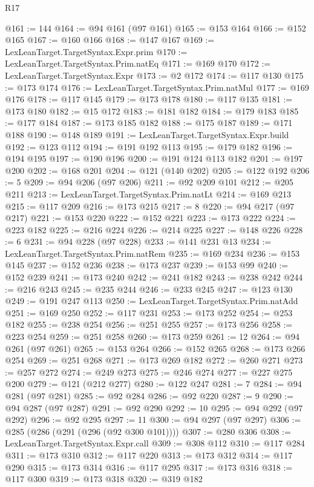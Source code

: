 \begin{lexlean}{R17}
\begin{coremodule}
@161 := 144
@164 := @94 @161 (@97 @161)
@165 := @153 @164
@166 := @152 @165
@167 := @160 @166
@168 := @147 @167
@169 := LexLeanTarget.TargetSyntax.Expr.prim
@170 := LexLeanTarget.TargetSyntax.Prim.natEq
@171 := @169 @170
@172 := LexLeanTarget.TargetSyntax.Expr
@173 := @2 @172
@174 := @117 @130
@175 := @173 @174
@176 := LexLeanTarget.TargetSyntax.Prim.natMul
@177 := @169 @176
@178 := @117 @145
@179 := @173 @178
@180 := @117 @135
@181 := @173 @180
@182 := @15 @172
@183 := @181 @182
@184 := @179 @183
@185 := @177 @184
@187 := @173 @185 @182
@188 := @175 @187
@189 := @171 @188
@190 := @148 @189
@191 := LexLeanTarget.TargetSyntax.Expr.build
@192 := @123 @112
@194 := @191 @192 @113
@195 := @179 @182
@196 := @194 @195
@197 := @190 @196
@200 := @191 @124 @113 @182
@201 := @197 @200
@202 := @168 @201
@204 := @121 (@140 @202)
@205 := @122 @192
@206 := 5
@209 := @94 @206 (@97 @206)
@211 := @92 @209 @101
@212 := @205 @211
@213 := LexLeanTarget.TargetSyntax.Prim.natLt
@214 := @169 @213
@215 := @117 @209
@216 := @173 @215
@217 := 8
@220 := @94 @217 (@97 @217)
@221 := @153 @220
@222 := @152 @221
@223 := @173 @222
@224 := @223 @182
@225 := @216 @224
@226 := @214 @225
@227 := @148 @226
@228 := 6
@231 := @94 @228 (@97 @228)
@233 := @141 @231 @13
@234 := LexLeanTarget.TargetSyntax.Prim.natRem
@235 := @169 @234
@236 := @153 @145
@237 := @152 @236
@238 := @173 @237
@239 := @153 @99
@240 := @152 @239
@241 := @173 @240
@242 := @241 @182
@243 := @238 @242
@244 := @216 @243
@245 := @235 @244
@246 := @233 @245
@247 := @123 @130
@249 := @191 @247 @113
@250 := LexLeanTarget.TargetSyntax.Prim.natAdd
@251 := @169 @250
@252 := @117 @231
@253 := @173 @252
@254 := @253 @182
@255 := @238 @254
@256 := @251 @255
@257 := @173 @256
@258 := @223 @254
@259 := @251 @258
@260 := @173 @259
@261 := 12
@264 := @94 @261 (@97 @261)
@265 := @153 @264
@266 := @152 @265
@268 := @173 @266 @254
@269 := @251 @268
@271 := @173 @269 @182
@272 := @260 @271
@273 := @257 @272
@274 := @249 @273
@275 := @246 @274
@277 := @227 @275 @200
@279 := @121 (@212 @277)
@280 := @122 @247
@281 := 7
@284 := @94 @281 (@97 @281)
@285 := @92 @284
@286 := @92 @220
@287 := 9
@290 := @94 @287 (@97 @287)
@291 := @92 @290
@292 := 10
@295 := @94 @292 (@97 @292)
@296 := @92 @295
@297 := 11
@300 := @94 @297 (@97 @297)
@306 := @285 (@286 (@291 (@296 (@92 @300 @101))))
@307 := @280 @306
@308 := LexLeanTarget.TargetSyntax.Expr.call
@309 := @308 @112
@310 := @117 @284
@311 := @173 @310
@312 := @117 @220
@313 := @173 @312
@314 := @117 @290
@315 := @173 @314
@316 := @117 @295
@317 := @173 @316
@318 := @117 @300
@319 := @173 @318
@320 := @319 @182

\end{coremodule}
\end{lexlean}
